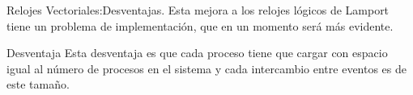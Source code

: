\begin{frame}[fragile]{Relojes Vectoriales:}{Desventajas.}
  Esta mejora a los relojes lógicos de Lamport tiene un problema
  de implementación, que en un momento será más evidente. 

  \begin{center}
    \begin{minipage}[b]{0.5\textwidth}
      \begin{exampleblock}{Desventaja}
        Esta desventaja es que cada proceso tiene que cargar con espacio
        igual al número de procesos en el sistema y cada intercambio
        entre eventos es de este tamaño.
      \end{exampleblock}    
    \end{minipage}
  \end{center}
\end{frame}
